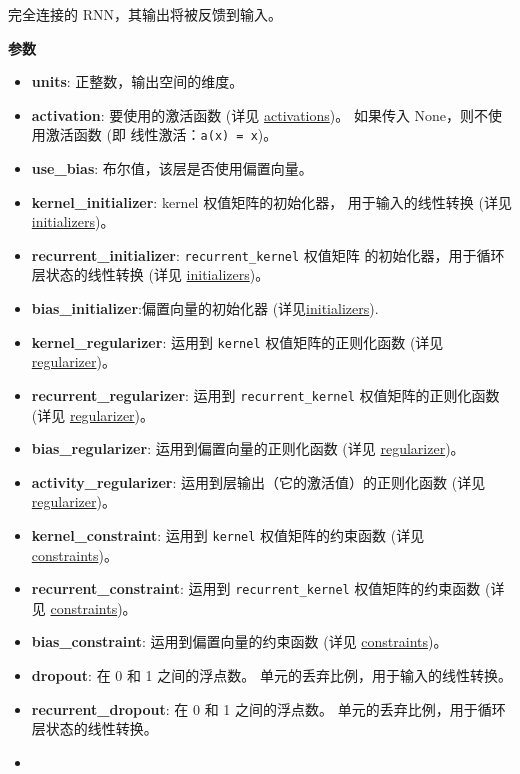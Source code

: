 完全连接的 RNN，其输出将被反馈到输入。

\textbf{参数}

\begin{itemize}
\tightlist
\item
  \textbf{units}: 正整数，输出空间的维度。
\item
  \textbf{activation}: 要使用的激活函数 (详见
  \hyperref[activations]{activations})。 如果传入
  None，则不使用激活函数 (即 线性激活：\texttt{a(x)\ =\ x})。
\item
  \textbf{use\_bias}: 布尔值，该层是否使用偏置向量。
\item
  \textbf{kernel\_initializer}: kernel 权值矩阵的初始化器，
  用于输入的线性转换 (详见 \hyperref[initializers]{initializers})。
\item
  \textbf{recurrent\_initializer}: \texttt{recurrent\_kernel} 权值矩阵
  的初始化器，用于循环层状态的线性转换 (详见
  \hyperref[initializers]{initializers})。
\item
  \textbf{bias\_initializer}:偏置向量的初始化器
  (详见\hyperref[initializers]{initializers}).
\item
  \textbf{kernel\_regularizer}: 运用到 \texttt{kernel}
  权值矩阵的正则化函数 (详见\hyperref[regularizers]{regularizer})。
\item
  \textbf{recurrent\_regularizer}: 运用到 \texttt{recurrent\_kernel}
  权值矩阵的正则化函数 (详见 \hyperref[regularizers]{regularizer})。
\item
  \textbf{bias\_regularizer}: 运用到偏置向量的正则化函数 (详见
  \hyperref[regularizers]{regularizer})。
\item
  \textbf{activity\_regularizer}: 运用到层输出（它的激活值）的正则化函数
  (详见 \hyperref[regularizers]{regularizer})。
\item
  \textbf{kernel\_constraint}: 运用到 \texttt{kernel} 权值矩阵的约束函数
  (详见 \hyperref[constraints]{constraints})。
\item
  \textbf{recurrent\_constraint}: 运用到 \texttt{recurrent\_kernel}
  权值矩阵的约束函数 (详见 \hyperref[constraints]{constraints})。
\item
  \textbf{bias\_constraint}: 运用到偏置向量的约束函数 (详见
  \hyperref[constraints]{constraints})。
\item
  \textbf{dropout}: 在 0 和 1 之间的浮点数。
  单元的丢弃比例，用于输入的线性转换。
\item
  \textbf{recurrent\_dropout}: 在 0 和 1 之间的浮点数。
  单元的丢弃比例，用于循环层状态的线性转换。
\item

\end{itemize}
